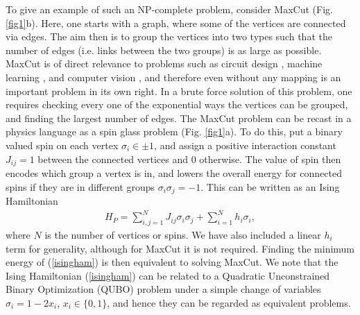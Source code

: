 \documentclass[fleqn,10pt]{wlscirep}
\def\change#1{#1}
\begin{document}
To give an example of such an NP-complete problem, consider  MaxCut (Fig. \ref{fig1}b).  Here, one starts with a graph, where some of the vertices are connected via edges.  The aim then is to group the vertices into two types such that the number of edges (i.e. links between the two groups) is as large as possible.  MaxCut is of direct relevance to problems such as \change{circuit design  \cite{barahona1988application ,1270247}, machine learning \cite{wang2013semi}, and computer vision \cite{collins2004graph, arora2010efficient}}, and therefore even without any mapping is an important problem in its own right.   In a brute force solution of this problem, one requires checking every one of the exponential ways the vertices can be grouped, and finding the largest number of edges. The MaxCut problem can be recast in a physics language as a spin glass problem (Fig. \ref{fig1}a).   To do this, put a binary valued spin on each vertex $ \sigma_i \in \pm 1$, and assign a positive interaction constant $ J_{ij} = 1 $ between the connected vertices and 0 otherwise. The value of spin then encodes which group a vertex is in, and lowers the overall energy for connected spins if they are in different groups \change{$ \sigma_i \sigma_j = -1  $.} This can be written as an Ising Hamiltonian 
%
\begin{align}
H_P = \sum_{i,j=1}^N J_{ij} \sigma_i \sigma_j +  \sum_{i=1}^N h_{i} \sigma_i  , 
\label{isingham}
\end{align}
%
where $ N $ is the number of vertices or spins.  We have also included a linear $ h_i $ term for generality, although for MaxCut it is not required.  Finding the minimum energy of (\ref{isingham}) is then equivalent to solving MaxCut. \change{We note that the Ising Hamiltonian (\ref{isingham}) can be related to a Quadratic Unconstrained Binary Optimization (QUBO) problem under a simple change of variables $ \sigma_i = 1 - 2 x_i $, $ x_i \in \{0,1\} $, and hence they can be regarded as equivalent problems. }
\end{document}
